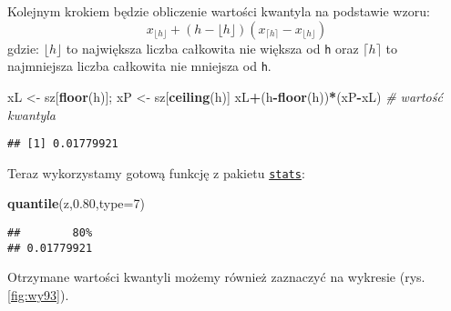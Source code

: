 \documentclass[polish,]{book}
\newenvironment{Shaded}{\begin{snugshade}}{\end{snugshade}}
\newcommand{\CommentTok}[1]{\textcolor[rgb]{0.56,0.35,0.01}{\textit{#1}}}
\newcommand{\DataTypeTok}[1]{\textcolor[rgb]{0.13,0.29,0.53}{#1}}
\newcommand{\DecValTok}[1]{\textcolor[rgb]{0.00,0.00,0.81}{#1}}
\newcommand{\FloatTok}[1]{\textcolor[rgb]{0.00,0.00,0.81}{#1}}
\newcommand{\KeywordTok}[1]{\textcolor[rgb]{0.13,0.29,0.53}{\textbf{#1}}}
\newcommand{\NormalTok}[1]{#1}
\newcommand{\OperatorTok}[1]{\textcolor[rgb]{0.81,0.36,0.00}{\textbf{#1}}}
\newcommand{\StringTok}[1]{\textcolor[rgb]{0.31,0.60,0.02}{#1}}
\begin{document}
Kolejnym krokiem będzie obliczenie wartości kwantyla na podstawie wzoru:
\begin{equation}
x_{\lfloor h \rfloor}+(h-{\lfloor h \rfloor})(x_{\lceil h\rceil}-x_{\lfloor h \rfloor})
\label{eq:wz94}
\end{equation}
gdzie: \(\lfloor h \rfloor\) to największa liczba całkowita nie większa od \texttt{h} oraz \(\lceil h \rceil\) to najmniejsza liczba całkowita nie mniejsza od \texttt{h}.

\begin{Shaded}
\begin{Highlighting}[]
\NormalTok{xL <-}\StringTok{ }\NormalTok{sz[}\KeywordTok{floor}\NormalTok{(h)]; xP <-}\StringTok{ }\NormalTok{sz[}\KeywordTok{ceiling}\NormalTok{(h)]}
\NormalTok{xL}\OperatorTok{+}\NormalTok{(h}\OperatorTok{-}\KeywordTok{floor}\NormalTok{(h))}\OperatorTok{*}\NormalTok{(xP}\OperatorTok{-}\NormalTok{xL) }\CommentTok{# wartość kwantyla}
\end{Highlighting}
\end{Shaded}

\begin{verbatim}
## [1] 0.01779921
\end{verbatim}

Teraz wykorzystamy gotową funkcję z pakietu \href{https://rdrr.io/r/\#stats}{\texttt{stats}}:

\begin{Shaded}
\begin{Highlighting}[]
\KeywordTok{quantile}\NormalTok{(z,}\FloatTok{0.80}\NormalTok{,}\DataTypeTok{type=}\DecValTok{7}\NormalTok{)}
\end{Highlighting}
\end{Shaded}

\begin{verbatim}
##        80% 
## 0.01779921
\end{verbatim}

Otrzymane wartości kwantyli możemy również zaznaczyć na wykresie (rys. \ref{fig:wy93}).
\end{document}
